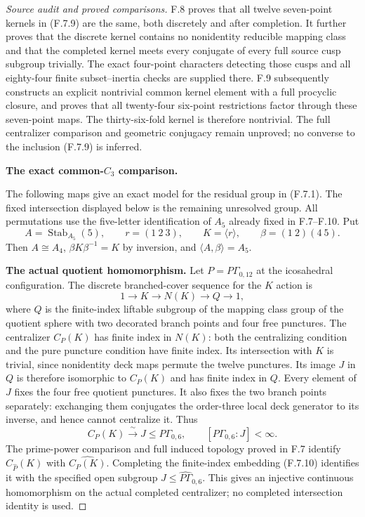 \begin{proof}[Source audit and proved comparisons]
F.8 proves that all twelve seven-point kernels in (F.7.9)
are the same, both discretely and after completion. It further
proves that the discrete kernel contains no nonidentity reducible
mapping class and that the completed kernel meets every conjugate
of every full source cusp subgroup trivially. The exact four-point
characters detecting those cusps and all eighty-four finite
subset--inertia checks are supplied there. F.9 subsequently
constructs an explicit nontrivial common kernel element with
a full procyclic closure, and proves that all twenty-four
six-point restrictions factor through these seven-point maps.
The thirty-six-fold kernel is therefore nontrivial. The full
centralizer comparison and geometric conjugacy remain unproved;
no converse to the inclusion (F.7.9) is inferred.

\medskip\noindent\textbf{The exact common-$C_3$ comparison.}

The following maps give an exact model for the residual group in (F.7.1).
The fixed intersection displayed below is the remaining unresolved group.
All permutations use the five-letter identification of $A_5$ already
fixed in F.7--F.10.  Put
\[
 A=\operatorname{Stab}_{A_5}(5),\qquad
 r=(1\ 2\ 3),\qquad K=\langle r\rangle,
 \qquad\beta=(1\ 2)(4\ 5).
\]
Then $A\cong A_4$, $\beta K\beta^{-1}=K$ by inversion,
and $\langle A,\beta\rangle=A_5$.

\medskip\noindent\textbf{The actual quotient homomorphism.}
Let $P=P\Gamma_{0,12}$ at the icosahedral configuration.
The discrete branched-cover sequence for the $K$ action is
\[
 1\longrightarrow K\longrightarrow N(K)
       \longrightarrow Q\longrightarrow1,
\]
where $Q$ is the finite-index liftable subgroup of the
mapping class group of the quotient sphere with two decorated
branch points and four free punctures.  The centralizer
$C_P(K)$ has finite index in $N(K)$: both the centralizing
condition and the pure puncture condition have finite index.
Its intersection with $K$ is trivial, since nonidentity deck
maps permute the twelve punctures.  Its image $J$ in $Q$ is
therefore isomorphic to $C_P(K)$ and has finite index in $Q$.
Every element of $J$ fixes the four free quotient punctures.
It also fixes the two branch points separately: exchanging
them conjugates the order-three local deck generator to its
inverse, and hence cannot centralize it.  Thus
\[
             C_P(K)\xrightarrow{\ \sim\ }J
                         \leq P\Gamma_{0,6},
               \qquad [P\Gamma_{0,6}:J]<\infty.          \tag{F.7.10}
\]
The prime-power comparison and full induced topology proved
in F.7 identify $C_{\widehat P}(K)$ with
$\widehat{C_P(K)}$.  Completing the finite-index embedding
(F.7.10) identifies it with the specified open subgroup
$\widehat J\leq\widehat{P\Gamma}_{0,6}$.  This gives an
injective continuous homomorphism on the actual completed
centralizer; no completed intersection identity is used.


\end{proof}
